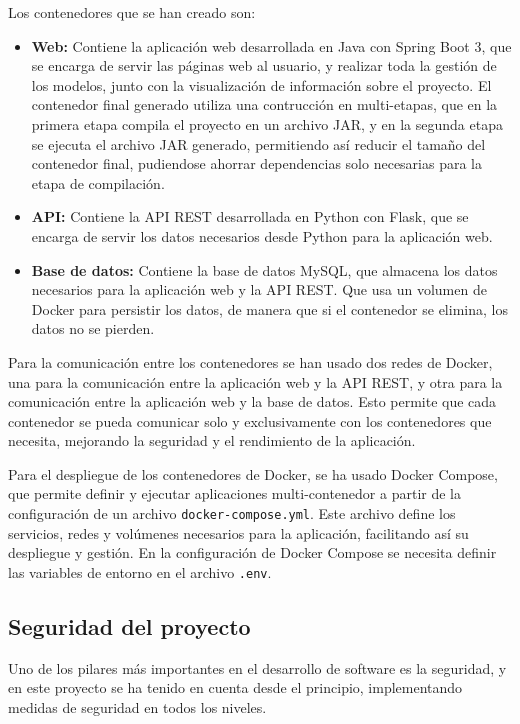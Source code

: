 Los contenedores que se han creado son:
\begin{itemize}
    \item \textbf{Web:} Contiene la aplicación web desarrollada en Java con Spring Boot 3, que se encarga de servir las páginas web al usuario, y realizar toda la gestión de los modelos, junto con la visualización de información sobre el proyecto. El contenedor final generado utiliza una contrucción en multi-etapas, que en la primera etapa compila el proyecto en un archivo JAR, y en la segunda etapa se ejecuta el archivo JAR generado, permitiendo así reducir el tamaño del contenedor final, pudiendose ahorrar dependencias solo necesarias para la etapa de compilación.
    \item \textbf{API:} Contiene la API REST desarrollada en Python con Flask, que se encarga de servir los datos necesarios desde Python para la aplicación web.
    \item \textbf{Base de datos:} Contiene la base de datos MySQL, que almacena los datos necesarios para la aplicación web y la API REST. Que usa un volumen de Docker para persistir los datos, de manera que si el contenedor se elimina, los datos no se pierden.
\end{itemize}
Para la comunicación entre los contenedores se han usado dos redes de Docker, una para la comunicación entre la aplicación web y la API REST, y otra para la comunicación entre la aplicación web y la base de datos. Esto permite que cada contenedor se pueda comunicar solo y exclusivamente con los contenedores que necesita, mejorando la seguridad y el rendimiento de la aplicación.

Para el despliegue de los contenedores de Docker, se ha usado Docker Compose, que permite definir y ejecutar aplicaciones multi-contenedor a partir de la configuración de un archivo \texttt{docker-compose.yml}. Este archivo define los servicios, redes y volúmenes necesarios para la aplicación, facilitando así su despliegue y gestión.
En la configuración de Docker Compose se necesita definir las variables de entorno en el archivo \texttt{.env}.


\subsection{Seguridad del proyecto}
Uno de los pilares más importantes en el desarrollo de software es la seguridad, y en este proyecto se ha tenido en cuenta desde el principio, implementando medidas de seguridad en todos los niveles.

